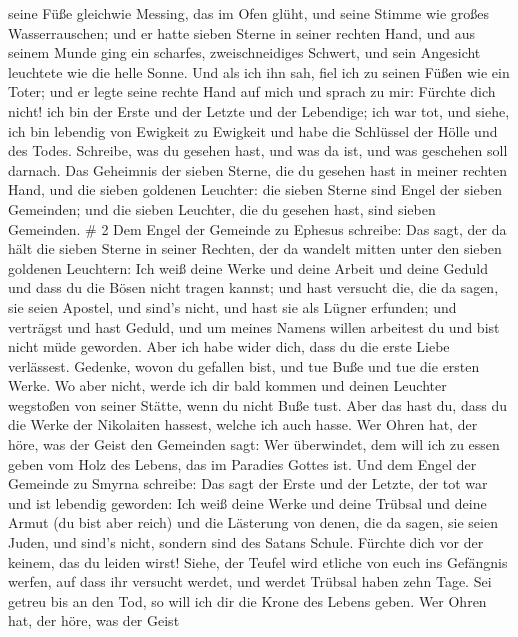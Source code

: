 seine Füße gleichwie Messing, das im Ofen glüht, und seine Stimme wie
großes Wasserrauschen;  und er hatte sieben Sterne in
seiner rechten Hand, und aus seinem Munde ging ein scharfes,
zweischneidiges Schwert, und sein Angesicht leuchtete wie die helle
Sonne.  Und als ich ihn sah, fiel ich zu seinen Füßen wie
ein Toter; und er legte seine rechte Hand auf mich und sprach zu mir:
Fürchte dich nicht! ich bin der Erste und der Letzte  und
der Lebendige; ich war tot, und siehe, ich bin lebendig von Ewigkeit zu
Ewigkeit und habe die Schlüssel der Hölle und des Todes. 
Schreibe, was du gesehen hast, und was da ist, und was geschehen soll
darnach.  Das Geheimnis der sieben Sterne, die du gesehen
hast in meiner rechten Hand, und die sieben goldenen Leuchter: die
sieben Sterne sind Engel der sieben Gemeinden; und die sieben Leuchter,
die du gesehen hast, sind sieben Gemeinden. \# 2  Dem Engel
der Gemeinde zu Ephesus schreibe: Das sagt, der da hält die sieben
Sterne in seiner Rechten, der da wandelt mitten unter den sieben
goldenen Leuchtern:  Ich weiß deine Werke und deine Arbeit
und deine Geduld und dass du die Bösen nicht tragen kannst; und hast
versucht die, die da sagen, sie seien Apostel, und sind's nicht, und
hast sie als Lügner erfunden;  und verträgst und hast
Geduld, und um meines Namens willen arbeitest du und bist nicht müde
geworden.  Aber ich habe wider dich, dass du die erste Liebe
verlässest.  Gedenke, wovon du gefallen bist, und tue Buße
und tue die ersten Werke. Wo aber nicht, werde ich dir bald kommen und
deinen Leuchter wegstoßen von seiner Stätte, wenn du nicht Buße tust.
 Aber das hast du, dass du die Werke der Nikolaiten hassest,
welche ich auch hasse.  Wer Ohren hat, der höre, was der
Geist den Gemeinden sagt: Wer überwindet, dem will ich zu essen geben
vom Holz des Lebens, das im Paradies Gottes ist.  Und dem
Engel der Gemeinde zu Smyrna schreibe: Das sagt der Erste und der
Letzte, der tot war und ist lebendig geworden:  Ich weiß
deine Werke und deine Trübsal und deine Armut (du bist aber reich) und
die Lästerung von denen, die da sagen, sie seien Juden, und sind's
nicht, sondern sind des Satans Schule.  Fürchte dich vor
der keinem, das du leiden wirst! Siehe, der Teufel wird etliche von euch
ins Gefängnis werfen, auf dass ihr versucht werdet, und werdet Trübsal
haben zehn Tage. Sei getreu bis an den Tod, so will ich dir die Krone
des Lebens geben.  Wer Ohren hat, der höre, was der Geist
